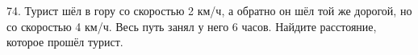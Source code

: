 74. Турист шёл в гору со скоростью 2 км/ч, а обратно он шёл той же дорогой, но со скоростью 4 км/ч. Весь путь занял у него 6 часов. Найдите расстояние, которое прошёл турист.\\
